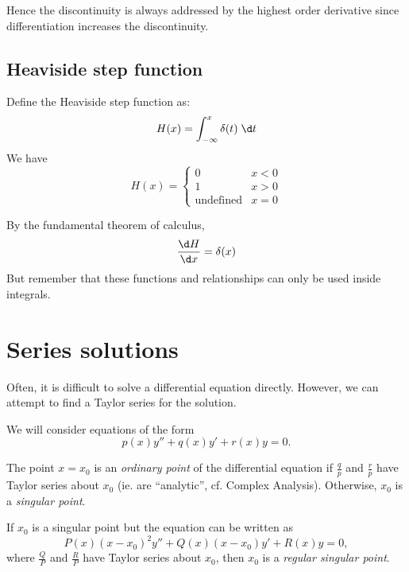 \documentclass[a4paper]{article}
\begin{document}
Hence the discontinuity is always addressed by the highest order derivative since differentiation increases the discontinuity.

\subsection{Heaviside step function}

\begin{defi}
  Define the Heaviside step function as:
  \[
    H(x) = \int_{-\infty}^x \delta(t) \;\d t
  \]
  We have
  \[
    H(x) =\begin{cases} 0 & x < 0\\1 & x > 0\\\text{undefined} & x = 0\end{cases}
  \]
  \begin{center}
  \end{center}
  By the fundamental theorem of calculus,
  \[
    \frac{\d H}{\d x} = \delta(x)
  \]
  But remember that these functions and relationships can only be used inside integrals.
\end{defi}

\section{Series solutions}
Often, it is difficult to solve a differential equation directly. However, we can attempt to find a Taylor series for the solution.

We will consider equations of the form
\[
  p(x) y'' + q(x) y' + r(x) y = 0.
\]
\begin{defi}
  The point $x = x_0$ is an \emph{ordinary point} of the differential equation if $\frac{q}{p}$ and $\frac{r}{p}$ have Taylor series about $x_0$ (ie. are ``analytic'', cf. Complex Analysis). Otherwise, $x_0$ is a \emph{singular point}.

  If $x_0$ is a singular point but the equation can be written as
  \[
    P(x)(x - x_0)^2y'' + Q(x)(x - x_0)y' + R(x)y = 0,
  \]
  where $\frac{Q}{P}$ and $\frac{R}{P}$ have Taylor series about $x_0$, then $x_0$ is a \emph{regular singular point}.
\end{defi}
\end{document}

